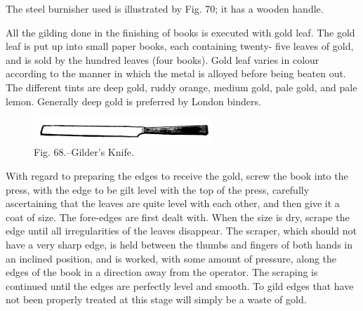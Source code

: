 \documentclass[twoside]{book}
\begin{document}
The steel burnisher used is illustrated by Fig.
70; it has a wooden handle.

All the gilding done in the finishing of books is
executed with gold leaf. The gold leaf is put up
into small paper books, each containing twenty- five
leaves of gold, and is sold by the hundred leaves
(four books). Gold leaf varies in colour according
to the manner in which the metal is alloyed before
being beaten out. The different tints are deep
gold, ruddy orange, medium gold, pale gold, and
pale lemon. Generally deep gold is preferred by London binders.
	\begin{figure}[h]
		\centering
		\includegraphics[width=0.6\textwidth]{Figures/_068.png}
		\caption*{Fig. 68.--Gilder's Knife.}
	\end{figure}
With regard to preparing the edges to receive
the gold, screw the book into the press, with the
edge to be gilt level with the top of the press,
carefully ascertaining that the leaves are quite
level with each other, and then give it a coat of
size. The fore-edges are first dealt with. When
the size is dry, scrape the edge until all irregularities
of the leaves disappear. The scraper, which
\pagebreak
should not have a very sharp edge, is held between
the thumbs and fingers of both hands in an
inclined position, and is worked, with some amount
of pressure, along the edges of the book in a
direction away from the operator. The scraping is
continued until the edges are perfectly level and
smooth. To gild edges that have not been properly
treated at this stage will simply be a waste of
gold.
\end{document}
